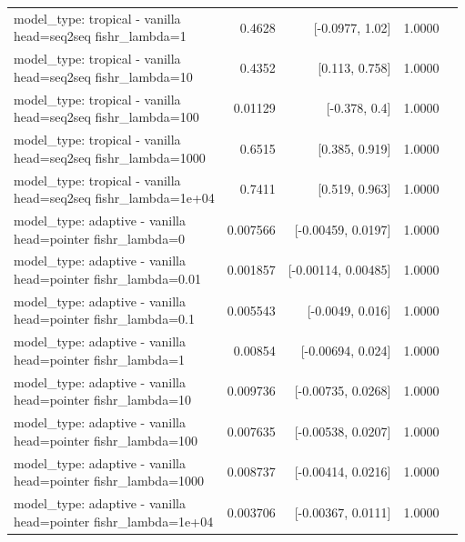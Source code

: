 \documentclass[10pt]{article}
\makeatletter
\newcommand{\stackcell}[1]{\begin{tabular}[t]{@{}l@{}}#1\end{tabular}}
\makeatother
\begin{document}
{\begin{longtable}{lrrrl}
\stackcell{model\_type: tropical - vanilla\\\footnotesize head=seq2seq fishr\_lambda=1 } & 0.4628 & [-0.0977, 1.02] & 1.0000 & \\
\stackcell{model\_type: tropical - vanilla\\\footnotesize head=seq2seq fishr\_lambda=10 } & 0.4352 & [0.113, 0.758] & 1.0000 & \\
\stackcell{model\_type: tropical - vanilla\\\footnotesize head=seq2seq fishr\_lambda=100 } & 0.01129 & [-0.378, 0.4] & 1.0000 & \\
\stackcell{model\_type: tropical - vanilla\\\footnotesize head=seq2seq fishr\_lambda=1000 } & 0.6515 & [0.385, 0.919] & 1.0000 & \\
\stackcell{model\_type: tropical - vanilla\\\footnotesize head=seq2seq fishr\_lambda=1e+04 } & 0.7411 & [0.519, 0.963] & 1.0000 & \\
\stackcell{model\_type: adaptive - vanilla\\\footnotesize head=pointer fishr\_lambda=0 } & 0.007566 & [-0.00459, 0.0197] & 1.0000 & \\
\stackcell{model\_type: adaptive - vanilla\\\footnotesize head=pointer fishr\_lambda=0.01 } & 0.001857 & [-0.00114, 0.00485] & 1.0000 & \\
\stackcell{model\_type: adaptive - vanilla\\\footnotesize head=pointer fishr\_lambda=0.1 } & 0.005543 & [-0.0049, 0.016] & 1.0000 & \\
\stackcell{model\_type: adaptive - vanilla\\\footnotesize head=pointer fishr\_lambda=1 } & 0.00854 & [-0.00694, 0.024] & 1.0000 & \\
\stackcell{model\_type: adaptive - vanilla\\\footnotesize head=pointer fishr\_lambda=10 } & 0.009736 & [-0.00735, 0.0268] & 1.0000 & \\
\stackcell{model\_type: adaptive - vanilla\\\footnotesize head=pointer fishr\_lambda=100 } & 0.007635 & [-0.00538, 0.0207] & 1.0000 & \\
\stackcell{model\_type: adaptive - vanilla\\\footnotesize head=pointer fishr\_lambda=1000 } & 0.008737 & [-0.00414, 0.0216] & 1.0000 & \\
\stackcell{model\_type: adaptive - vanilla\\\footnotesize head=pointer fishr\_lambda=1e+04 } & 0.003706 & [-0.00367, 0.0111] & 1.0000 & \\

\end{longtable}}
\end{document}
